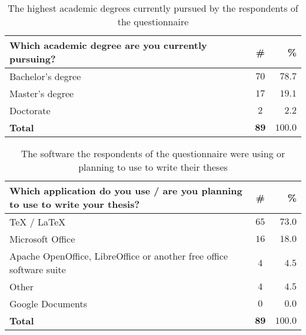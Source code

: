 \documentclass[12pt,twoside,cover,color,table]%
  {fithesis3/fithesis3/fithesis3} %
\begin{document}
  \begin{table}
    \caption{The highest academic degrees currently pursued by the
      respondents of the questionnaire}
    \begin{tabularx}{\textwidth}{Xcr}
      \textbf{Which academic degree are you currently pursuing?} &
      \textbf{\#} & \textbf{\%} \\
      \toprule
      Bachelor's degree  & $70$          & $78.7$ \\
      Master's degree    & $17$          & $19.1$ \\
      Doctorate          & $2$           & $2.2$  \\
      \bottomrule
      \textbf{Total}     & $\mathbf{89}$ & $\mathbf{100.0}$
    \end{tabularx}
    \label{table:survey-type}
  \end{table}

  \begin{table}
    \caption{The software the respondents of the questionnaire
      were using or planning to use to write their theses}
    \begin{tabularx}{\textwidth}{Xcr}
      \textbf{Which application do you use / are you planning to
      use to write your thesis?} & \textbf{\#} & \textbf{\%} \\
      \toprule
      \TeX{ / \LaTeX{}}     & $65$          & $73.0$ \\
      Microsoft Office      & $16$          & $18.0$ \\
      Apache OpenOffice, LibreOffice or another free office
      software suite        & $4$           &  $4.5$ \\
      Other                 & $4$           &  $4.5$ \\
      Google Documents      & $0$           &  $0.0$ \\
      \bottomrule
      \textbf{Total}        & $\mathbf{89}$ & $\mathbf{100.0}$
    \end{tabularx}
    \label{table:survey-sw}
  \end{table}
\end{document}
